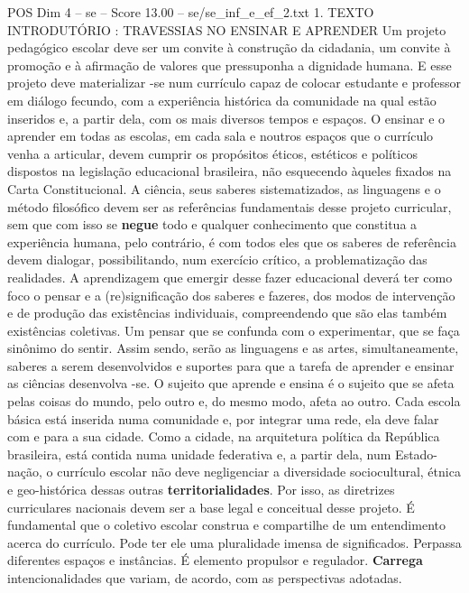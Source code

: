 \begin{textsample}{POS Dim 4 – se – Score 13.00 – se/se\_inf\_e\_ef\_2.txt}  \label{ex:f4_pos_141}
1.
TEXTO INTRODUTÓRIO : TRAVESSIAS NO ENSINAR E APRENDER Um projeto pedagógico escolar deve ser um convite à construção da cidadania, um convite à promoção e à afirmação de valores que pressuponha a dignidade humana.
E esse projeto deve materializar -se num currículo capaz de colocar estudante e professor em diálogo fecundo, com a experiência histórica da comunidade na qual estão inseridos e, a partir dela, com os mais diversos tempos e espaços.
O ensinar e o aprender em todas as escolas, em cada sala e noutros espaços que o currículo venha a articular, devem cumprir os propósitos éticos, estéticos e políticos dispostos na legislação educacional brasileira, não esquecendo àqueles fixados na Carta Constitucional.
A ciência, seus saberes sistematizados, as linguagens e o método filosófico devem ser as referências fundamentais desse projeto curricular, sem que com isso se \textbf{negue} todo e qualquer conhecimento que constitua a experiência humana, pelo contrário, é com todos eles que os saberes de referência devem dialogar, possibilitando, num exercício crítico, a problematização das realidades.
A aprendizagem que emergir desse fazer educacional deverá ter como foco o pensar e a (re)significação dos saberes e fazeres, dos modos de intervenção e de produção das existências individuais, compreendendo que são elas também existências coletivas.
Um pensar que se confunda com o experimentar, que se faça sinônimo do sentir.
Assim sendo, serão as linguagens e as artes, simultaneamente, saberes a serem desenvolvidos e suportes para que a tarefa de aprender e ensinar as ciências desenvolva -se.
O sujeito que aprende e ensina é o sujeito que se afeta pelas coisas do mundo, pelo outro e, do mesmo modo, afeta ao outro.
Cada escola básica está inserida numa comunidade e, por integrar uma rede, ela deve falar com e para a sua cidade.
Como a cidade, na arquitetura política da República brasileira, está contida numa unidade federativa e, a partir dela, num Estado-nação, o currículo escolar não deve negligenciar a diversidade sociocultural, étnica e geo-histórica dessas outras \textbf{territorialidades}.
Por isso, as diretrizes curriculares nacionais devem ser a base legal e conceitual desse projeto.
É fundamental que o coletivo escolar construa e compartilhe de um entendimento acerca do currículo.
Pode ter ele uma pluralidade imensa de significados.
Perpassa diferentes espaços e instâncias.
É elemento propulsor e regulador. \textbf{Carrega} intencionalidades que variam, de acordo, com as perspectivas adotadas.

\end{textsample}
